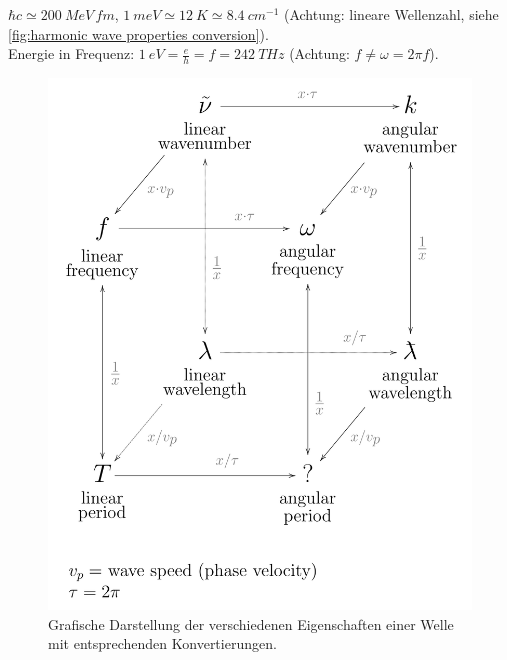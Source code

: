 $\hbar c \simeq \SI{200}{MeV\,fm}$, $\SI{1}{meV} \simeq \SI{12}{K} \simeq \SI{8.4}{cm^{-1}}$ (Achtung: lineare Wellenzahl, siehe \autoref{fig:harmonic wave properties conversion}).
\\
Energie in Frequenz: $\SI{1}{eV} = \frac{e}{h} = f = \SI{242}{THz}$ (Achtung: $f\neq \omega = 2\pi f$).

\begin{figure}[!ht]
    \centering
    \includegraphics[width=.8\linewidth]{img/Commutative_diagram_of_harmonic_wave_properties.png}
    \caption{Grafische Darstellung der verschiedenen Eigenschaften einer Welle mit entsprechenden Konvertierungen.
    }
    \label{fig:harmonic wave properties conversion}
\end{figure}




